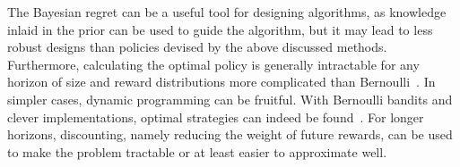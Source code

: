 The Bayesian regret can be a useful tool for designing algorithms, as knowledge inlaid in the prior can be used to guide the algorithm, but it may lead to less robust designs than policies devised by the above discussed methods.
Furthermore, calculating the optimal policy is generally intractable for any horizon of size and reward distributions more complicated than Bernoulli~\autocite{lattimore2020}.
In simpler cases, dynamic programming can be fruitful.
With Bernoulli bandits and clever implementations, optimal strategies can indeed be found~\autocite{pilarski2021}.
For longer horizons, discounting, namely reducing the weight of future rewards, can be used to make the problem tractable or at least easier to approximate well.